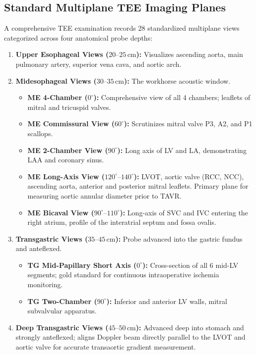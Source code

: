\documentclass[11pt,a4paper]{article}
\begin{document}
\subsection{Standard Multiplane TEE Imaging Planes}

A comprehensive TEE examination records 28 standardized multiplane views categorized across four anatomical probe depths:
\begin{enumerate}[leftmargin=*]
    \item \textbf{Upper Esophageal Views ($20\text{--}25\,\text{cm}$):} Visualizes ascending aorta, main pulmonary artery, superior vena cava, and aortic arch.
    \item \textbf{Midesophageal Views ($30\text{--}35\,\text{cm}$):} The workhorse acoustic window.
    \begin{itemize}
        \item \textbf{ME 4-Chamber ($0^\circ$):} Comprehensive view of all 4 chambers; leaflets of mitral and tricuspid valves.
        \item \textbf{ME Commissural View ($60^\circ$):} Scrutinizes mitral valve P3, A2, and P1 scallops.
        \item \textbf{ME 2-Chamber View ($90^\circ$):} Long axis of LV and LA, demonstrating LAA and coronary sinus.
        \item \textbf{ME Long-Axis View ($120^\circ\text{--}140^\circ$):} LVOT, aortic valve (RCC, NCC), ascending aorta, anterior and posterior mitral leaflets. Primary plane for measuring aortic annular diameter prior to TAVR.
        \item \textbf{ME Bicaval View ($90^\circ\text{--}110^\circ$):} Long-axis of SVC and IVC entering the right atrium, profile of the interatrial septum and fossa ovalis.
    \end{itemize}
    \item \textbf{Transgastric Views ($35\text{--}45\,\text{cm}$):} Probe advanced into the gastric fundus and anteflexed.
    \begin{itemize}
        \item \textbf{TG Mid-Papillary Short Axis ($0^\circ$):} Cross-section of all 6 mid-LV segments; gold standard for continuous intraoperative ischemia monitoring.
        \item \textbf{TG Two-Chamber ($90^\circ$):} Inferior and anterior LV walls, mitral subvalvular apparatus.
    \end{itemize}
    \item \textbf{Deep Transgastric Views ($45\text{--}50\,\text{cm}$):} Advanced deep into stomach and strongly anteflexed; aligns Doppler beam directly parallel to the LVOT and aortic valve for accurate transaortic gradient measurement.
\end{enumerate}
\end{document}
